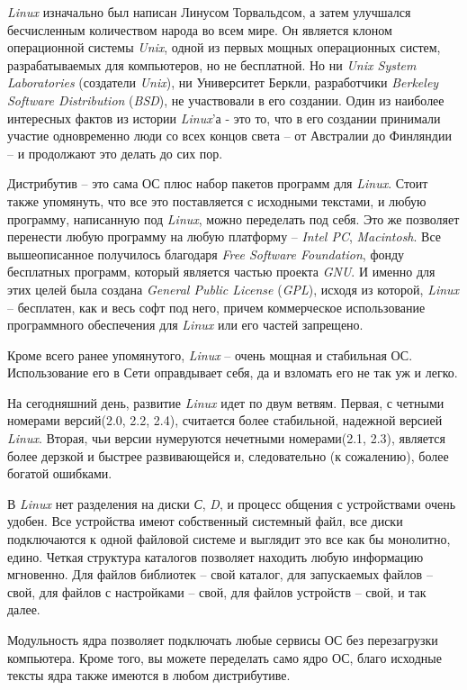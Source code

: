 \textit{Linux} изначально был написан Линусом Торвальдсом, а затем улучшался бесчисленным количеством народа во всем мире. Он является клоном операционной системы \textit{Unix}, одной из первых мощных операционных систем, разрабатываемых для компьютеров, но не бесплатной. Но ни \textit{Unix System Laboratories} (создатели \textit{Unix}), ни Университет Беркли, разработчики \textit{Berkeley Software Distribution} (\textit{BSD}), не участвовали в его создании. Один из наиболее интересных фактов из истории \textit{Linux}'а - это то, что в его создании принимали участие одновременно люди со всех концов света – от Австралии до Финляндии – и продолжают это делать до сих пор.

Дистрибутив – это сама ОС плюс набор пакетов программ для \textit{Linux}. Стоит также упомянуть, что все это поставляется с исходными текстами, и любую программу, написанную под \textit{Linux}, можно переделать под себя. Это же позволяет перенести любую программу на любую платформу –\textit{ Intel PC}, \textit{Macintosh}. Все вышеописанное получилось благодаря \textit{Free Software Foundation}, фонду бесплатных программ, который является частью проекта \textit{GNU}. И именно для этих целей была создана \textit{General Public License} (\textit{GPL}), исходя из которой, \textit{Linux} – бесплатен, как и весь софт под него, причем коммерческое использование программного обеспечения для \textit{Linux} или его частей запрещено.

Кроме всего ранее упомянутого, \textit{Linux} – очень мощная и стабильная ОС. Использование его в Сети оправдывает себя, да и взломать его не так уж и легко.

На сегодняшний день, развитие \textit{Linux} идет по двум ветвям. Первая, с четными номерами версий(2.0, 2.2, 2.4), считается более стабильной, надежной версией \textit{Linux}. Вторая, чьи версии нумеруются нечетными номерами(2.1, 2.3), является более дерзкой и быстрее развивающейся и, следовательно (к сожалению), более богатой ошибками.

В \textit{Linux} нет разделения на диски \textit{С}, \textit{D}, и процесс общения с устройствами очень удобен. Все устройства имеют собственный системный файл, все диски подключаются к одной файловой системе и выглядит это все как бы монолитно, едино. Четкая структура каталогов позволяет находить любую информацию мгновенно. Для файлов библиотек – свой каталог, для запускаемых файлов – свой, для файлов с настройками – свой, для файлов устройств – свой, и так далее.

Модульность ядра позволяет подключать любые сервисы ОС без перезагрузки компьютера. Кроме того, вы можете переделать само ядро ОС, благо исходные тексты ядра также имеются в любом дистрибутиве.

